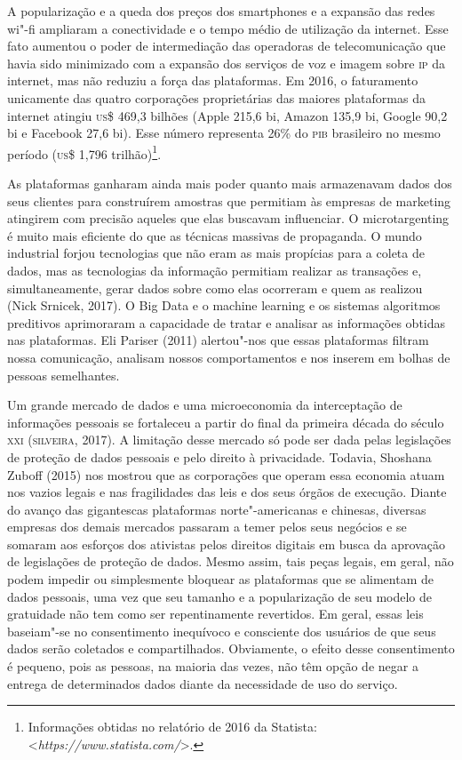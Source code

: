 A popularização e a queda dos preços dos smartphones e a expansão das
redes wi"-fi ampliaram a conectividade e o tempo médio de utilização da
internet. Esse fato aumentou o poder de intermediação das operadoras de
telecomunicação que havia sido minimizado com a expansão dos serviços de
voz e imagem sobre \textsc{ip} da internet, mas não reduziu a força das
plataformas. Em 2016, o faturamento unicamente das quatro corporações
proprietárias das maiores plataformas da internet atingiu \textsc{us}\$ 469,3
bilhões (Apple 215,6 bi, Amazon 135,9 bi, Google 90,2 bi e Facebook 27,6
bi). Esse número representa 26\% do \textsc{pib} brasileiro no mesmo período
(\textsc{us}\$ 1,796 trilhão)\footnote{Informações obtidas no relatório de 2016
  da Statista: \textless{}\emph{https://www.statista.com/}\textgreater{}.}.

As plataformas ganharam ainda mais poder quanto mais armazenavam dados
dos seus clientes para construírem amostras que permitiam às empresas de
marketing atingirem com precisão aqueles que elas buscavam influenciar.
O microtargenting é muito mais eficiente do que as técnicas massivas de
propaganda. O mundo industrial forjou tecnologias que não eram as mais
propícias para a coleta de dados, mas as tecnologias da informação
permitiam realizar as transações e, simultaneamente, gerar dados sobre
como elas ocorreram e quem as realizou (Nick Srnicek, 2017). O Big Data
e o machine learning e os sistemas algoritmos preditivos aprimoraram a
capacidade de tratar e analisar as informações obtidas nas plataformas.
Eli Pariser (2011) alertou"-nos que essas plataformas filtram nossa
comunicação, analisam nossos comportamentos e nos inserem em bolhas de
pessoas semelhantes.

Um grande mercado de dados e uma microeconomia da interceptação de
informações pessoais se fortaleceu a partir do final da primeira década
do século \textsc{xxi} (\textsc{silveira}, 2017). A limitação desse mercado só pode ser
dada pelas legislações de proteção de dados pessoais e pelo direito à
privacidade. Todavia, Shoshana Zuboff (2015) nos mostrou que as
corporações que operam essa economia atuam nos vazios legais e nas
fragilidades das leis e dos seus órgãos de execução. Diante do avanço
das gigantescas plataformas norte"-americanas e chinesas, diversas
empresas dos demais mercados passaram a temer pelos seus negócios e se
somaram aos esforços dos ativistas pelos direitos digitais em busca da
aprovação de legislações de proteção de dados. Mesmo assim, tais peças
legais, em geral, não podem impedir ou simplesmente bloquear as
plataformas que se alimentam de dados pessoais, uma vez que seu tamanho
e a popularização de seu modelo de gratuidade não tem como ser
repentinamente revertidos. Em geral, essas leis baseiam"-se no
consentimento inequívoco e consciente dos usuários de que seus dados
serão coletados e compartilhados. Obviamente, o efeito desse
consentimento é pequeno, pois as pessoas, na maioria das vezes, não têm
opção de negar a entrega de determinados dados diante da necessidade de
uso do serviço.

